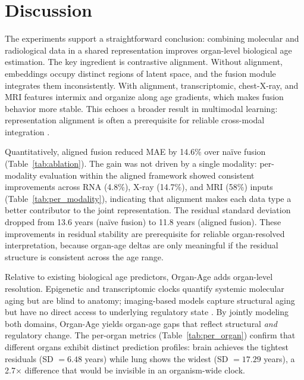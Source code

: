 \documentclass[10pt,twocolumn]{article}
\begin{document}
\section{Discussion}

The experiments support a straightforward conclusion: combining molecular and radiological data
in a shared representation improves organ-level biological age estimation. The key ingredient is
contrastive alignment. Without alignment, embeddings occupy distinct regions of latent space, and
the fusion module integrates them inconsistently. With alignment, transcriptomic, chest-X-ray, and
MRI features intermix and organize along age gradients, which makes fusion behavior more stable.
This echoes a broader result in multimodal learning: representation alignment is often a
prerequisite for reliable cross-modal integration \cite{baltrusaitis2018survey}.

Quantitatively, aligned fusion reduced MAE by 14.6\% over na\"ive fusion
(Table~\ref{tab:ablation}). The gain was not driven by a single modality:
per-modality evaluation within the aligned framework showed consistent improvements across RNA
(4.8\%), X-ray (14.7\%), and MRI (58\%) inputs (Table~\ref{tab:per_modality}), indicating that
alignment makes each data type a better contributor to the joint representation. The residual
standard deviation dropped from 13.6 years (na\"ive fusion) to 11.8 years (aligned fusion).
These improvements in residual stability are prerequisite for reliable organ-resolved
interpretation, because organ-age deltas are only meaningful if the residual structure is
consistent across the age range.

Relative to existing biological age predictors, Organ-Age adds organ-level resolution. Epigenetic
and transcriptomic clocks quantify systemic molecular aging but are blind to anatomy; imaging-based
models capture structural aging but have no direct access to underlying regulatory state
\cite{putin2016deepaging}. By jointly modeling both domains, Organ-Age yields organ-age gaps that
reflect structural \emph{and} regulatory change. The per-organ metrics (Table~\ref{tab:per_organ})
confirm that different organs exhibit distinct prediction profiles: brain achieves the tightest
residuals (SD $= 6.48$ years) while lung shows the widest (SD $= 17.29$ years), a 2.7$\times$
difference that would be invisible in an organism-wide clock.
\end{document}
